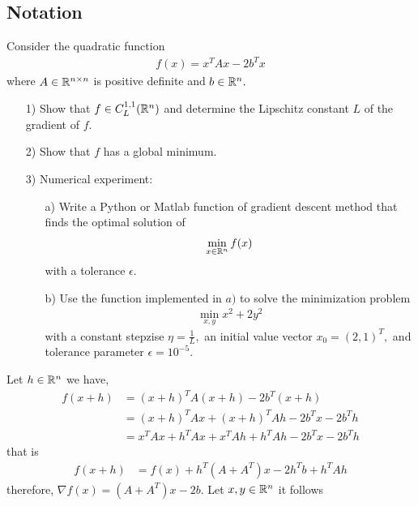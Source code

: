 \documentclass{ExerciseSheet}
\newif\ifsolutions
\begin{document}


\subsection*{Notation}
\vskip 0.5cm 
\begin{problem}
 Consider the quadratic function
  \begin{align*}
      f(x) = x^TAx - 2b^Tx
  \end{align*}
  where $A\in \mathbb{R}^{n\times n}$ is positive definite and $b\in \mathbb{R}^n.$
  \begin{enumerate}
      \item [1)] Show that $f \in C^{1,1}_L(\mathbb{R}^n)$ and determine the Lipschitz constant $L$ of the gradient of $f.$
      \item[2)] Show that $f$ has a global minimum.
      \item[3)] Numerical experiment:\\
      \begin{itemize}
          \item [a)]  Write a Python or Matlab function of gradient descent method that finds the optimal solution of 
      \begin{align*}
          \min_{x\in\mathbb{R}^n} f(x)
      \end{align*}
      with a tolerance $\epsilon.$

      \item[b)] Use the function implemented in $a)$ to solve the minimization problem
         \begin{align*}
             \min_{x,y} x^2 + 2y^2
         \end{align*}
         with a constant stepzise $\eta=\frac{1}{L},$ an initial value vector $x_0=(2,1)^T,$ and tolerance parameter $\epsilon=10^{-5}.$ 
      \end{itemize}  
  \end{enumerate}
\end{problem}

\ifsolutions
\vskip 0.3cm

\begin{solution}
Let $h\in\mathbb{R}^n$ we have,
\begin{align*}
    f(x+h) &= (x+h)^TA(x+h) -2b^T(x+h) \\
           &= (x+h)^TAx + (x+h)^TAh -2b^Tx -2b^Th\\
           &= x^TAx + h^TAx + x^TAh + h^TAh -2b^Tx - 2b^Th
\end{align*}
that is 
 \begin{align*}
     f(x+h) &= f(x) + h^T(A+A^T)x - 2h^Tb + h^TAh
 \end{align*}
 therefore,
 $\nabla f(x) = (A+A^T)x - 2b.$ Let $x,y\in\mathbb{R}^n$ it follows

\end{solution}
\end{document}
